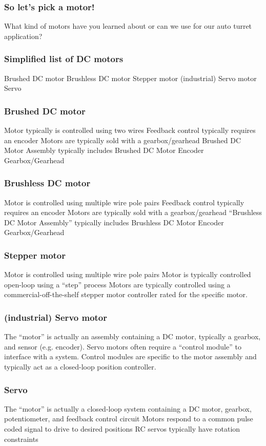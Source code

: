 \documentclass[aspectratio=169]{beamer}
\begin{document}
\begin{frame}
\frametitle{So let's pick a motor!}
What kind of motors have you learned about or can we use for our auto turret application?
\end{frame}

\begin{frame}
\frametitle{Simplified list of DC motors}
Brushed DC motor
Brushless DC motor
Stepper motor
(industrial) Servo motor
Servo
\end{frame}

\begin{frame}
\frametitle{Brushed DC motor}
Motor typically is controlled using two wires
Feedback control typically requires an encoder
Motors are typically sold with a gearbox/gearhead
Brushed DC Motor Assembly typically includes
Brushed DC Motor
Encoder
Gearbox/Gearhead
\end{frame}

\begin{frame}
\frametitle{Brushless DC motor}
Motor is controlled using multiple wire pole pairs
Feedback control typically requires an encoder
Motors are typically sold with a gearbox/gearhead
“Brushless DC Motor Assembly” typically includes
Brushless DC Motor
Encoder
Gearbox/Gearhead
\end{frame}

\begin{frame}
\frametitle{Stepper motor}
Motor is controlled using multiple wire pole pairs
Motor is typically controlled open-loop using a “step” process
Motors are typically controlled using a commercial-off-the-shelf stepper motor controller rated for the specific motor.
\end{frame}

\begin{frame}
\frametitle{(industrial) Servo motor}
The “motor” is actually an assembly containing a DC motor, typically a gearbox, and sensor (e.g. encoder).
Servo motors often require a “control module” to interface with a system.
Control modules are specific to the motor assembly and typically act as a closed-loop position controller.
\end{frame}

\begin{frame}
\frametitle{Servo}
The “motor” is actually a closed-loop system containing a DC motor, gearbox, potentiometer, and feedback control circuit
Motors respond to a common pulse coded signal to drive to desired positions
RC servos typically have rotation constraints
\end{frame}
\end{document}
